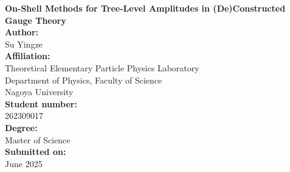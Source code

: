 \documentclass[12pt]{article}
\numberwithin{equation}{section}
\begin{document}
\begin{titlepage}
    \centering
    \vspace*{2cm}

    {\LARGE \textbf{On-Shell Methods for Tree-Level Amplitudes in (De)Constructed Gauge Theory}}\\[1.5cm]

    \textbf{Author:} \\
    {\Large Su Yingze} \\[1cm]

    \textbf{Affiliation:} \\
    Theoretical Elementary Particle Physics Laboratory\\
    Department of Physics, Faculty of Science \\
    Nagoya University \\[1cm]

    \textbf{Student number:} \\
    262309017 \\[1cm]

    \textbf{Degree:} \\
    Master of Science \\[1cm]

    \textbf{Submitted on:} \\
    June 2025 \\[2cm]

    \vfill
\end{titlepage}
\newpage
\end{document}
